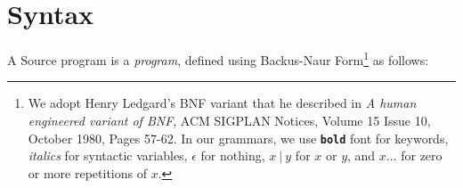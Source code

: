 \section{Syntax}

A Source program is a \emph{program}, defined using Backus-Naur Form\footnote{
We adopt Henry Ledgard's BNF variant that he described in
\emph{A human engineered variant of BNF}, ACM SIGPLAN Notices, Volume 15 Issue 10,
October 1980, Pages 57-62. In our grammars, we use \textbf{\texttt{bold}} font for keywords,
{\it italics} for syntactic variables, $\epsilon$ for nothing,
$x\ |\ y$ for $x$ or $y$, and $ x \ldots$ for zero or more repetitions of $x$.}
as follows:
